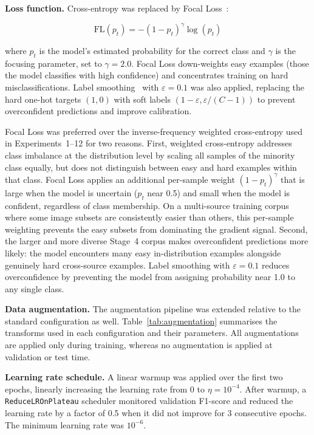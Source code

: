 \textbf{Loss function.} Cross-entropy was replaced by Focal Loss~\cite{lin2017}:

\begin{equation}
  \text{FL}(p_t) = -(1 - p_t)^{\gamma} \log(p_t)
  \label{eq:focal_loss}
\end{equation}

where $p_t$ is the model's estimated probability for the correct class and $\gamma$ is the
focusing parameter, set to $\gamma = 2.0$. Focal Loss down-weights easy examples (those the
model classifies with high confidence) and concentrates training on hard misclassifications.
Label smoothing~\cite{szegedy2016rethinking} with $\varepsilon = 0.1$ was also applied, replacing the hard one-hot targets
$(1, 0)$ with soft labels $(1 - \varepsilon, \varepsilon / (C-1))$ to prevent overconfident
predictions and improve calibration.

Focal Loss was preferred over the inverse-frequency weighted cross-entropy used in
Experiments~1--12 for two reasons. First, weighted cross-entropy addresses class imbalance
at the distribution level by scaling all samples of the minority class equally, but does
not distinguish between easy and hard examples within that class. Focal Loss applies an
additional per-sample weight $(1 - p_t)^\gamma$ that is large when the model is uncertain
($p_t$ near 0.5) and small when the model is confident, regardless of class membership.
On a multi-source training corpus where some image subsets are consistently easier than
others, this per-sample weighting prevents the easy subsets from dominating the gradient
signal. Second, the larger and more diverse Stage~4 corpus makes overconfident predictions
more likely: the model encounters many easy in-distribution examples alongside genuinely
hard cross-source examples. Label smoothing with $\varepsilon = 0.1$ reduces overconfidence
by preventing the model from assigning probability near 1.0 to any single class.

\textbf{Data augmentation.} The augmentation pipeline was extended relative to the standard
configuration as well. Table~\ref{tab:augmentation} summarises the transforms used in each
configuration and their parameters. All augmentations are applied only during training,
whereas no augmentation is applied at validation or test time.

\textbf{Learning rate schedule.} A linear warmup was applied over the first two epochs,
linearly increasing the learning rate from 0 to $\eta = 10^{-4}$. After warmup, a
\texttt{ReduceLROnPlateau} scheduler monitored validation F1-score and reduced the learning
rate by a factor of 0.5 when it did not improve for 3 consecutive epochs. The minimum learning
rate was $10^{-6}$.

